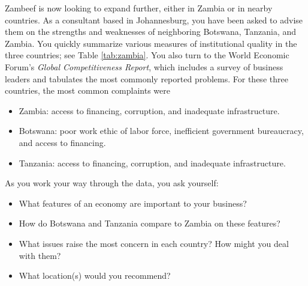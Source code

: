 \documentclass[12pt]{article}
\begin{document}
Zambeef is now looking to expand further, either in Zambia or in nearby countries.
As a consultant based in Johannesburg,
you have been asked to advise them on the strengths and weaknesses
of neighboring Botswana, Tanzania, and Zambia.
You quickly summarize various measures of institutional quality in the three countries;
see Table \ref{tab:zambia}.
You also turn to the World Economic Forum's {\it Global Competitiveness Report\/},
which includes a survey of business leaders and tabulates the most commonly
reported problems.
For these three countries, the most common complaints were
\begin{itemize} \itemsep=0.0in
\item Zambia:  access to financing, corruption, and inadequate infrastructure.
\item Botswana:  poor work ethic of labor force, inefficient government bureaucracy,
and access to financing.
\item Tanzania:  access to financing, corruption, and inadequate infrastructure.
\end{itemize}


As you work your way through the data, you ask yourself:  
\begin{itemize} \itemsep=0.0in
\item What features of an economy are important to your business?  
\item How do Botswana and Tanzania compare to Zambia on these features?
\item What issues raise the most concern in each country?
How might you deal with them?
\item What location(s) would you recommend?
\end{itemize}
\end{document}
